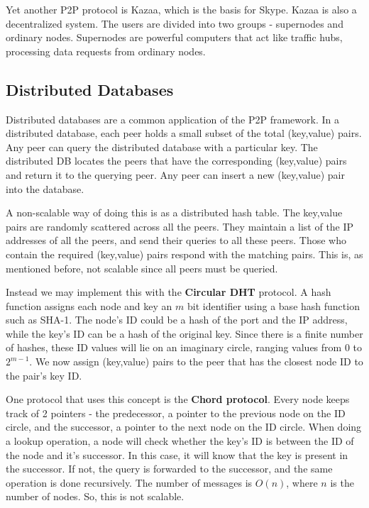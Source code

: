\documentclass[12pt,letterpaper]{article}
\theoremstyle{definition}
\begin{document}
Yet another P2P protocol is Kazaa, which is the basis for Skype. Kazaa is also a decentralized system. The users are divided into two groups - supernodes and ordinary nodes. Supernodes are powerful computers that act like traffic hubs, processing data requests from ordinary nodes.

\subsection{Distributed Databases}

Distributed databases are a common application of the P2P framework. In a distributed database, each peer holds a small subset of the total (key,value) pairs. Any peer can query the distributed database with a particular key. The distributed DB locates the peers that have the corresponding (key,value) pairs and return it to the querying peer. Any peer can insert a new (key,value) pair into the database. 

A non-scalable way of doing this is as a distributed hash table. The key,value pairs are randomly scattered across all the peers. They maintain a list of the IP addresses of all the peers, and send their queries to all these peers. Those who contain the required (key,value) pairs respond with the matching pairs. This is, as mentioned before, not scalable since all peers must be queried.

Instead we may implement this with the \textbf{Circular DHT}  protocol. A hash function assigns each node and key an $m$ bit identifier using a base hash function such as SHA-1. The node's ID could be a hash of the port and the IP address, while the key's ID can be a hash of the original key. Since there is a finite number of hashes, these ID values will lie on an imaginary circle, ranging values from $0$ to $2^{m-1}$. We now assign (key,value) pairs to the peer that has the closest node ID to the pair's key ID.

One protocol that uses this concept is the \textbf{Chord protocol}. Every node keeps track of 2 pointers - the predecessor, a pointer to the previous node on the ID circle, and the successor, a pointer to the next node on the ID circle. When doing a lookup operation, a node will check whether the key's ID is between the ID of the node and it's successor. In this case, it will know that the key is present in the successor. If not, the query is forwarded to the successor, and the same operation is done recursively. The number of messages is $O(n)$, where $n$ is the number of nodes. So, this is not scalable.
\end{document}
